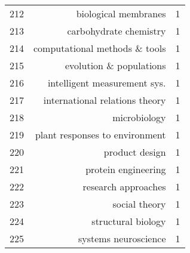 \begin{spacing}{0.9}
\begin{longtable}[c]{r|r|>{\raggedleft\arraybackslash}m{2.3cm}}
{212} & {biological membranes} & {1}\\
{213} & {carbohydrate chemistry} & {1}\\
{214} & {computational methods \& tools} & {1}\\
{215} & {evolution \& populations} & {1}\\
{216} & {intelligent measurement sys.} & {1}\\
{217} & {international relations theory} & {1}\\
{218} & {microbiology} & {1}\\
{219} & {plant responses to environment} & {1}\\
{220} & {product design} & {1}\\
{221} & {protein engineering} & {1}\\
{222} & {research approaches} & {1}\\
{223} & {social theory} & {1}\\
{224} & {structural biology} & {1}\\
{225} & {systems neuroscience} & {1}
\end{longtable}
\end{spacing}

\clearpage

